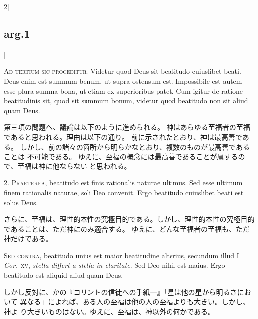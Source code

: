 \documentclass[paper=a4paper,fontsize=10pt,jafontsize=9pt,titlepage]{jlreq}
\begin{document}
\begin{paracol}{2}[\subsection{arg.1}]

{\Huge A}{\scshape d tertium sic proceditur}. Videtur quod Deus sit beatitudo cuiuslibet
beati. Deus enim est summum bonum, ut supra ostensum est. Impossibile
est autem esse plura summa bona, ut etiam ex superioribus patet. Cum
igitur de ratione beatitudinis sit, quod sit summum bonum, videtur quod
beatitudo non sit aliud quam Deus.

\switchcolumn

第三項の問題へ、議論は以下のように進められる。
神はあらゆる至福者の至福であると思われる。理由は以下の通り。
前に示されたとおり、神は最高善である。
しかし、前の諸々の箇所から明らかなとおり、複数のものが最高善であることは
 不可能である。
ゆえに、至福の概念には最高善であることが属するので、至福は神に他ならない
 と思われる。


2. {\scshape Praeterea}, beatitudo est finis rationalis naturae ultimus. Sed esse
ultimum finem rationalis naturae, soli Deo convenit. Ergo beatitudo
cuiuslibet beati est solus Deus.

\switchcolumn

さらに、至福は、理性的本性の究極目的である。しかし、理性的本性の究極目的
 であることは、ただ神にのみ適合する。
ゆえに、どんな至福者の至福も、ただ神だけである。

\switchcolumn*[\subsection{s.c.}]

{\scshape Sed contra}, beatitudo unius est maior beatitudine alterius, secundum
illud I {\itshape Cor}.~{\scshape xv}, {\itshape stella differt a stella in claritate}. Sed Deo nihil est
maius. Ergo beatitudo est aliquid aliud quam Deus.

\switchcolumn

しかし反対に、かの『コリントの信徒への手紙一』「星は他の星から明るさにおいて
 異なる」によれば、ある人の至福は他の人の至福よりも大きい。しかし、神よ
 り大きいものはない。ゆえに、至福は、神以外の何かである。


\end{paracol}
\end{document}
